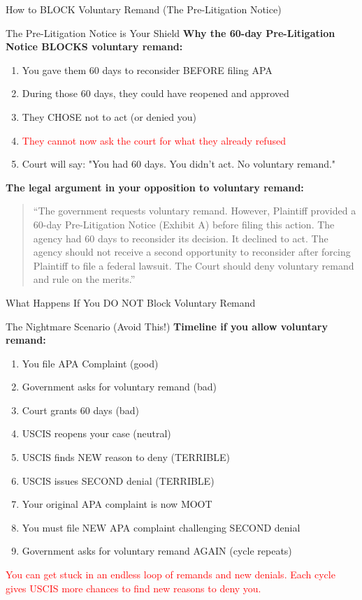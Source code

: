 \documentclass[11pt]{beamer}
\begin{document}
	\begin{frame}{How to BLOCK Voluntary Remand (The Pre-Litigation Notice)}
		\scriptsize
		\begin{block}{The Pre-Litigation Notice is Your Shield}
			\textbf{Why the 60-day Pre-Litigation Notice BLOCKS voluntary remand:}
			\vspace{0.2cm}
			\begin{enumerate}
				\item You gave them 60 days to reconsider BEFORE filing APA
				\item During those 60 days, they could have reopened and approved
				\item They CHOSE not to act (or denied you)
				\item \textcolor{red}{They cannot now ask the court for what they already refused}
				\item Court will say: "You had 60 days. You didn't act. No voluntary remand."
			\end{enumerate}
			\textbf{The legal argument in your opposition to voluntary remand:}
			\begin{quote}
				\scriptsize
				``The government requests voluntary remand. However, Plaintiff provided a 60-day Pre-Litigation Notice (Exhibit A) before filing this action. The agency had 60 days to reconsider its decision. It declined to act. The agency should not receive a second opportunity to reconsider after forcing Plaintiff to file a federal lawsuit. The Court should deny voluntary remand and rule on the merits.''
			\end{quote}
		\end{block}
	\end{frame}
	
	\begin{frame}{What Happens If You DO NOT Block Voluntary Remand}
		\scriptsize
		\begin{block}{The Nightmare Scenario (Avoid This!)}
			\textbf{Timeline if you allow voluntary remand:}
			\vspace{0.2cm}
			\begin{enumerate}
				\item You file APA Complaint (good)
				\item Government asks for voluntary remand (bad)
				\item Court grants 60 days (bad)
				\item USCIS reopens your case (neutral)
				\item USCIS finds NEW reason to deny (TERRIBLE)
				\item USCIS issues SECOND denial (TERRIBLE)
				\item Your original APA complaint is now MOOT
				\item You must file NEW APA complaint challenging SECOND denial
				\item Government asks for voluntary remand AGAIN (cycle repeats)
			\end{enumerate}
			\textcolor{red}{You can get stuck in an endless loop of remands and new denials.}
			\textcolor{red}{Each cycle gives USCIS more chances to find new reasons to deny you.}
		\end{block}
	\end{frame}
	
\end{document}
